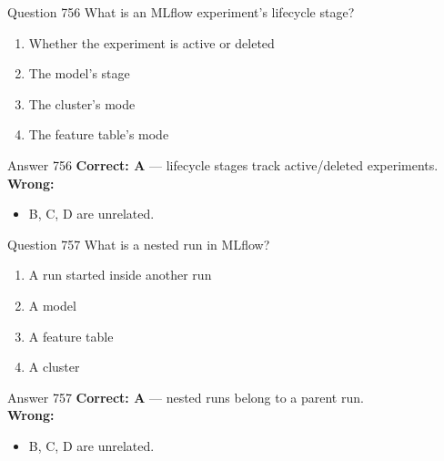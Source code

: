 \documentclass[aspectratio=169,11pt]{beamer}
\begin{document}
	\begin{frame}{Question 756}
		What is an MLflow experiment's lifecycle stage?
		\begin{enumerate}[label=\Alph*.]
			\item Whether the experiment is active or deleted
			\item The model's stage
			\item The cluster's mode
			\item The feature table's mode
		\end{enumerate}
	\end{frame}
	\begin{frame}{Answer 756}
		\textbf{Correct: A} --- lifecycle stages track active/deleted experiments.\\
		\vspace{0.5em}
		\textbf{Wrong:}
		\begin{itemize}
			\item B, C, D are unrelated.
		\end{itemize}
	\end{frame}
	
	\begin{frame}{Question 757}
		What is a nested run in MLflow?
		\begin{enumerate}[label=\Alph*.]
			\item A run started inside another run
			\item A model
			\item A feature table
			\item A cluster
		\end{enumerate}
	\end{frame}
	\begin{frame}{Answer 757}
		\textbf{Correct: A} --- nested runs belong to a parent run.\\
		\vspace{0.5em}
		\textbf{Wrong:}
		\begin{itemize}
			\item B, C, D are unrelated.
		\end{itemize}
	\end{frame}
	
\end{document}
